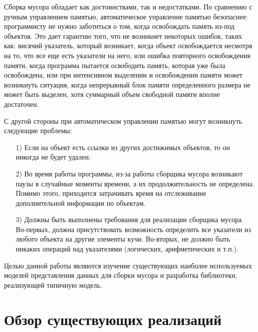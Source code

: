 Сборка мусора обладает как достоинствами, так и недостатками.
По сравнению с ручным управлением памятью, автоматическое управление памятью безопаснее: программисту не нужно 
заботиться о том, когда освобождать память из-под объектов. 
Это дает гарантию того, что не возникнет некоторых ошибок, таких как:
висячий указатель, который возникает, когда объект освобождается несмотря на то, 
что все еще есть
указатели на него, или ошибка повторного освобождения памяти, 
когда программа пытается освободить память, которая уже  была освобождена, 
или при интенсивном выделении и освобождении памяти может возникнуть ситуация,
когда непрерывный блок памяти определенного размера не может быть выделен,
хотя суммарный объем свободной памяти вполне достаточен.

С другой стороны при автоматическом управлении памятью могут возникнуть следующие проблемы:
\begin{enumerate}
\item[1)] Если на объект есть ссылки из других достижимых объектов, то он никогда не будет удален.
\item[2)] Во время работы программы, из-за работы сборщика мусора возникают паузы в случайные моменты времени, а их продолжительность не определена.
Помимо этого, приходится затрачивать время на отслеживание дополнительной информации по объектам.
\item[3)] Должны быть выполнены  требования для реализации сборщика мусора.
Во-первых, должна присутствовать возможность определить все указатели из любого объекта на другие элементы кучи.
Во-вторых, не должно быть никаких операций над указателями (логических, арифметических и т.п.).
\end{enumerate}
Целью данной работы являются изучение существующих наиболее используемых моделей представления данных для сборки мусора и
разработка библиотеки, реализующей типичную модель.

\section{Обзор существующих реализаций}

